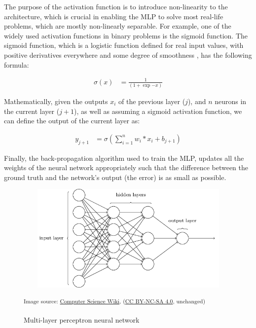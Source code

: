 \documentclass[extern,palatino]{cgMA}
\begin{document}
The purpose of the activation function is to introduce non-linearity to the architecture, which is crucial in enabling the MLP to solve most real-life problems, which are mostly non-linearly separable. For example, one of the widely used activation functions in binary problems is the sigmoid function. The sigmoid function, which is a logistic function defined for real input values, with positive derivatives everywhere and some degree of smoothness \cite{nwankpa2018activation}, has the following formula:

\begin{align*}
    \sigma(x) &= \frac{1}{(1 + \exp{-x})}
\end{align*}

Mathematically, given the outputs $x_{i}$ of the previous layer ($j$), and $n$ neurons in the current layer ($j+1$), as well as assuming a sigmoid activation function, we can define the output of the current layer as:

\begin{align*}
    y_{j+1} &= \sigma(\sum_{i=1}^{n} w_{i}*x_{i} + b_{j+1})
\end{align*}

Finally, the back-propagation algorithm used to train the MLP, updates all the weights of the neural network appropriately such that the difference between the ground truth and the network's output (the error) is as small as possible.

\begin{figure}[h]
\center
\includegraphics[height={150pt}, width={350pt}]{images/multilayer-perceptron.png}
\caption{Multi-layer perceptron neural network}
\small\textsuperscript{Image source: \href{https://computersciencewiki.org/index.php/Multi-layer_perceptron_(MLP)}{Computer Science Wiki}, (\href{https://creativecommons.org/licenses/by-nc-sa/4.0/}{CC BY-NC-SA 4.0}, unchanged)}
\label{multi_layer_perceptron}
\end{figure}
\end{document}
